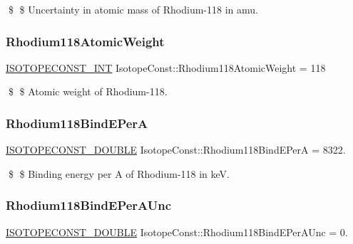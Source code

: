 \$ \$ Uncertainty in atomic mass of Rhodium-\/118 in amu. \mbox{\label{group___isotope_const-_rhodium-_rh118_ga3529481c2bf82ab09589bfefac8fa586}} 
\subsubsection{\texorpdfstring{Rhodium118\+Atomic\+Weight}{Rhodium118AtomicWeight}}
{\footnotesize\ttfamily \mbox{\hyperlink{group___isotope_const-_macros_ga5f18360b3e99483a35c32d789e62621c}{I\+S\+O\+T\+O\+P\+E\+C\+O\+N\+S\+T\+\_\+\+I\+NT}} Isotope\+Const\+::\+Rhodium118\+Atomic\+Weight = 118}

\$ \$ Atomic weight of Rhodium-\/118. \mbox{\label{group___isotope_const-_rhodium-_rh118_gaf89e680dc65f2feac32ecb379f105ac4}} 
\subsubsection{\texorpdfstring{Rhodium118\+Bind\+E\+PerA}{Rhodium118BindEPerA}}
{\footnotesize\ttfamily \mbox{\hyperlink{group___isotope_const-_macros_ga8f45a7272ce02c0b4c65c44636ed719a}{I\+S\+O\+T\+O\+P\+E\+C\+O\+N\+S\+T\+\_\+\+D\+O\+U\+B\+LE}} Isotope\+Const\+::\+Rhodium118\+Bind\+E\+PerA = 8322.}

\$ \$ Binding energy per A of Rhodium-\/118 in keV. \mbox{\label{group___isotope_const-_rhodium-_rh118_ga9dfd658c58258dc94f56cfdbe9031831}} 
\subsubsection{\texorpdfstring{Rhodium118\+Bind\+E\+Per\+A\+Unc}{Rhodium118BindEPerAUnc}}
{\footnotesize\ttfamily \mbox{\hyperlink{group___isotope_const-_macros_ga8f45a7272ce02c0b4c65c44636ed719a}{I\+S\+O\+T\+O\+P\+E\+C\+O\+N\+S\+T\+\_\+\+D\+O\+U\+B\+LE}} Isotope\+Const\+::\+Rhodium118\+Bind\+E\+Per\+A\+Unc = 0.}

